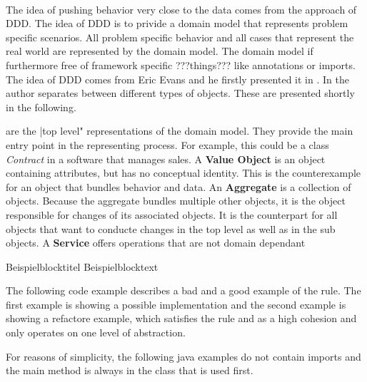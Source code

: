 \\

The idea of pushing behavior very close to the data comes from the approach of \acf{DDD}. The idea of \acf{DDD} is to privide a domain model that represents problem specific scenarios. All problem specific behavior and all cases that represent the real world are represented by the domain model. The domain model if furthermore free of framework specific ???things??? like annotations or imports. The idea of \acf{DDD} comes from Eric Evans and he firstly presented it in \cite{ddd}. 
In \cite{ddd} the author separates between different types of objects. These are presented shortly in the following. 

 are the |top level" representations of the domain model. They provide the main entry point in the representing process. For example, this could be a class \textit{Contract} in a software that manages sales. 
A \textbf{Value Object} is an object containing attributes, but has no conceptual identity. This is the counterexample for an object that bundles behavior and data. 
An \textbf{Aggregate} is a collection of objects. Because the aggregate bundles multiple other objects, it is the object responsible for changes of its associated objects. It is the counterpart for all objects that want to conducte changes in the top level as well as in the sub objects. 
A \textbf{Service} offers operations that are not domain dependant
\begin{exampleblock}{Beispielblocktitel}
        Beispielblocktext
\end{exampleblock}






















The following code example describes a bad and a good example of the rule. The first example is showing a possible implementation and the second example is showing a refactore example, which satisfies the rule and as a high cohesion and only operates on one level of abstraction. 

For reasons of simplicity, the following java examples do not contain imports and the main method is always in the class that is used first. 

